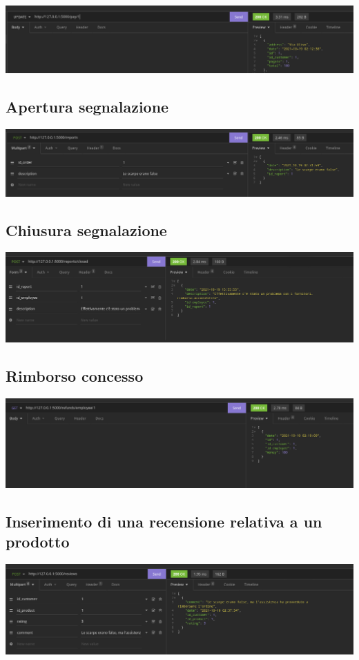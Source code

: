 \includegraphics[scale=0.33]{images/ordine_pagato.png}

\subsection{Apertura segnalazione}

\includegraphics[scale=0.33]{images/inserimento_segnalazione.png}

\subsection{Chiusura segnalazione}

\includegraphics[scale=0.33]{images/chiusura_segnalazione.png}

\subsection{Rimborso concesso}

\includegraphics[scale=0.33]{images/rimborso.png}

\subsection{Inserimento di una recensione relativa a un prodotto}

\includegraphics[scale=0.33]{images/recensione.png}


